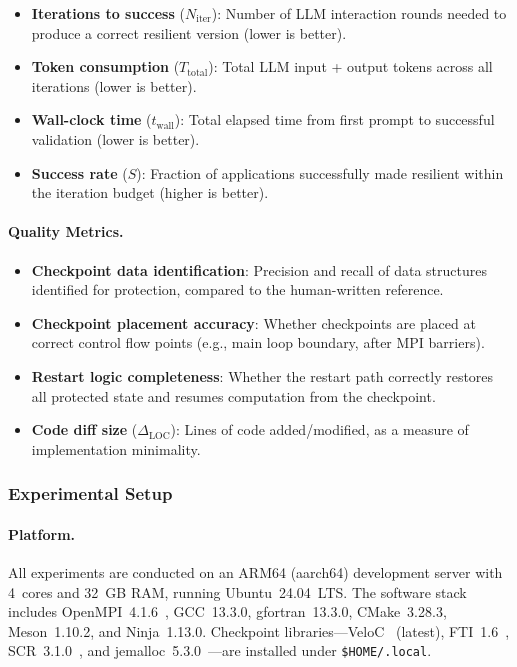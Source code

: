 \begin{itemize}
    \item \textbf{Iterations to success} ($N_\text{iter}$): Number of LLM interaction rounds needed to produce a correct resilient version (lower is better).
    \item \textbf{Token consumption} ($T_\text{total}$): Total LLM input + output tokens across all iterations (lower is better).
    \item \textbf{Wall-clock time} ($t_\text{wall}$): Total elapsed time from first prompt to successful validation (lower is better).
    \item \textbf{Success rate} ($S$): Fraction of applications successfully made resilient within the iteration budget (higher is better).
\end{itemize}

\paragraph{Quality Metrics.}

\begin{itemize}
    \item \textbf{Checkpoint data identification}: Precision and recall of data structures identified for protection, compared to the human-written reference.
    \item \textbf{Checkpoint placement accuracy}: Whether checkpoints are placed at correct control flow points (e.g., main loop boundary, after MPI barriers).
    \item \textbf{Restart logic completeness}: Whether the restart path correctly restores all protected state and resumes computation from the checkpoint.
    \item \textbf{Code diff size} ($\Delta_\text{LOC}$): Lines of code added/modified, as a measure of implementation minimality.
\end{itemize}

\subsubsection{Experimental Setup}
\label{sec:setup}

\paragraph{Platform.}

All experiments are conducted on an ARM64 (aarch64) development server with 4~cores and 32~GB RAM, running Ubuntu~24.04~LTS. The software stack includes OpenMPI~4.1.6~\cite{openmpi}, GCC~13.3.0, gfortran~13.3.0, CMake~3.28.3, Meson~1.10.2, and Ninja~1.13.0. Checkpoint libraries---VeloC~\cite{veloc} (latest), FTI~1.6~\cite{fti}, SCR~3.1.0~\cite{scr}, and jemalloc~5.3.0~\cite{jemalloc}---are installed under \texttt{\$HOME/.local}.

